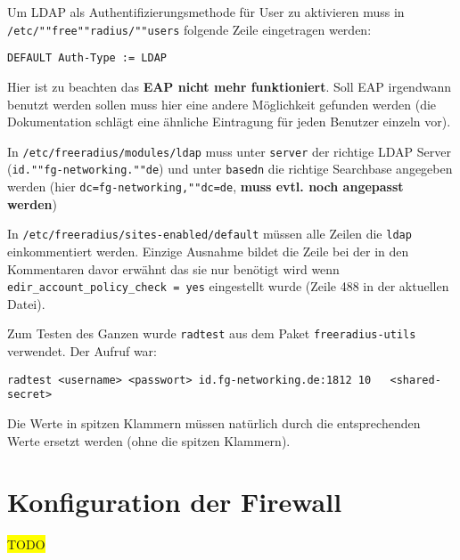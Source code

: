 \documentclass[11pt,a4paper,titlepage=firstiscover,headsepline,bibtotoc]{scrartcl} %
\newcommand{\hilight}[1]{\colorbox{yellow}{#1}} %
\begin{document}
Um LDAP als Authentifizierungsmethode für User zu aktivieren muss in \texttt{/etc/""free""radius/""users} folgende Zeile eingetragen werden:
\begin{lstlisting}
DEFAULT Auth-Type := LDAP
\end{lstlisting}
Hier ist zu beachten das \textbf{EAP nicht mehr funktioniert}. Soll EAP irgendwann benutzt werden sollen muss hier eine andere Möglichkeit gefunden werden (die Dokumentation schlägt eine ähnliche Eintragung für jeden Benutzer einzeln vor).

In \texttt{/etc/freeradius/modules/ldap} muss unter \texttt{server} der richtige LDAP Server (\texttt{id.""fg-networking.""de}) und unter \texttt{basedn} die richtige Searchbase angegeben werden (hier \texttt{dc=fg-networking,""dc=de}, \textbf{muss evtl. noch angepasst werden})

In \texttt{/etc/freeradius/sites-enabled/default} müssen alle Zeilen die \texttt{ldap} einkommentiert werden. Einzige Ausnahme bildet die Zeile bei der in den Kommentaren davor erwähnt das sie nur benötigt wird wenn \texttt{edir\_account\_policy\_check = yes} eingestellt wurde (Zeile 488 in der aktuellen Datei).

Zum Testen des Ganzen wurde \texttt{radtest} aus dem Paket \texttt{freeradius-utils} verwendet. Der Aufruf war:
\begin{lstlisting}
radtest <username> <passwort> id.fg-networking.de:1812 10	<shared-secret>
\end{lstlisting}
Die Werte in spitzen Klammern müssen natürlich durch die entsprechenden Werte ersetzt werden (ohne die spitzen Klammern).


\newpage
\section{Konfiguration der Firewall}\label{sec:Firewall-Konfig}
\hilight{TODO}

\newpage
\end{document}
